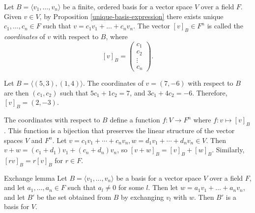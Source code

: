 \begin{defn}
    Let $B = \langle v_1, \ldots, v_n\rangle$ be a finite, ordered basis for a vector space $V$ over a field $F$. Given $v \in V$, by Proposition \ref{unique-basis-expression} there exists unique $c_1, \ldots, c_n \in F$ such that $v = c_1v_1 + \ldots + c_nv_n$. The vector $[v]_B \in F^n$ is called the \emph{coordinates} of $v$ with respect to $B$, where
    \[[v]_B = \begin{pmatrix}c_1 \\ c_2 \\ \vdots \\ c_n\end{pmatrix}.\]
\end{defn}

\begin{exmp}
    Let $B = \langle (5, 3), (1, 4)\rangle$. The coordinates of $v = (7, -6)$ with respect to $B$ are then $(c_1, c_2)$ such that $5c_1 + 1c_2 = 7$, and $3c_1 + 4c_2 = -6$. Therefore, $[v]_B = (2, -3)$.
\end{exmp}

\begin{rmk}
    The coordinates with respect to $B$ define a function $f: V \to F^n$ where $f: v \mapsto [v]_B$. This function is a bijection that preserves the linear structure of the vector spaces $V$ and $F^n$. Let $v = c_1v_1 + \cdots + c_nv_n, w = d_1v_1 + \cdots + d_nv_n \in V$. Then $v + w = (c_1 + d_1)v_1 + (c_n + d_n)v_n$, so $[v+w]_B = [v]_B + [w]_B$. Similarly, $[rv]_B = r[v]_B$ for $r \in F$.
\end{rmk}

\begin{lemma}{Exchange lemma}\label{exchange-lemma}\proofbreak
    Let $B = \langle v_1, \ldots, v_n \rangle$ be a basis for a vector space $V$ over a field $F$, and let $a_1, \ldots, a_n \in F$ such that $a_l \neq 0$ for some $l$. Then let $w = a_1v_1 + \ldots + a_nv_n$, and let $B'$ be the set obtained from $B$ by exchanging $v_l$ with $w$. Then $B'$ is a basis for $V$.
\end{lemma}

